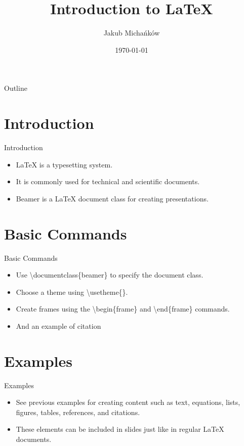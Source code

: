 \documentclass{beamer} %
\title{Introduction to LaTeX}
\author{Jakub Michańków}
\date{\today}
\begin{document}
\begin{frame} %
  \titlepage %
\end{frame}

\begin{frame}{Outline} 
  \tableofcontents 
\end{frame}

\section{Introduction} %
\begin{frame}{Introduction} %
  \begin{itemize}
    \item LaTeX is a typesetting system.
    \item It is commonly used for technical and scientific documents.
    \item Beamer is a LaTeX document class for creating presentations.
  \end{itemize}
\end{frame}

\section{Basic Commands} %
\begin{frame}{Basic Commands} %
  \begin{itemize}
    \item Use \textbackslash documentclass\{beamer\} to specify the document class.
    \item Choose a theme using \textbackslash usetheme\{\}.
    \item Create frames using the \textbackslash begin\{frame\} and \textbackslash end\{frame\} commands.
    \item And an example of citation \cite{einstein1905}
  \end{itemize}
\end{frame}

\section{Examples} %
\begin{frame}{Examples} %
  \begin{itemize}
    \item See previous examples for creating content such as text, equations, lists, figures, tables, references, and citations.
    \item These elements can be included in slides just like in regular LaTeX documents.
  \end{itemize}
\end{frame}
\end{document}
